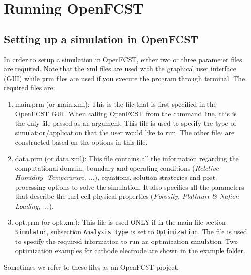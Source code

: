 \chapter{Running OpenFCST}

\section{Setting up a simulation in OpenFCST}

In order to setup a simulation in OpenFCST, either two or three parameter files are required. Note that the xml files are used with the graphical user interface (GUI) while prm files are used if you execute the program through terminal. The required files are:
\begin{enumerate}
 \item main.prm (or main.xml): This is the file that is first specified in the OpenFCST GUI. When calling OpenFCST from the command line, this is the only file passed as an argument. This file is used to specify the type of simulation/application that the user would like to run. The other files are constructed based on the options in this file.
 \item data.prm (or data.xml): This file contains all the information regarding the computational domain, boundary and operating conditions (\textit{Relative Humidity, Temperature, ...}), equations, solution strategies and post-processing options to solve the simulation. It also specifies all the parameters that describe the fuel cell physical properties (\textit{Porosity, Platinum \& Nafion Loading, ...}).
 \item opt.prm (or opt.xml): This file is used ONLY if in the main file section \texttt{Simulator}, subsection \texttt{Analysis type} is set to \texttt{Optimization}. The file is used to specify the required information to run an optimization simulation. Two optimization examples for cathode electrode are shown in the example folder.
\end{enumerate}
Sometimes we refer to these files as an OpenFCST project.

